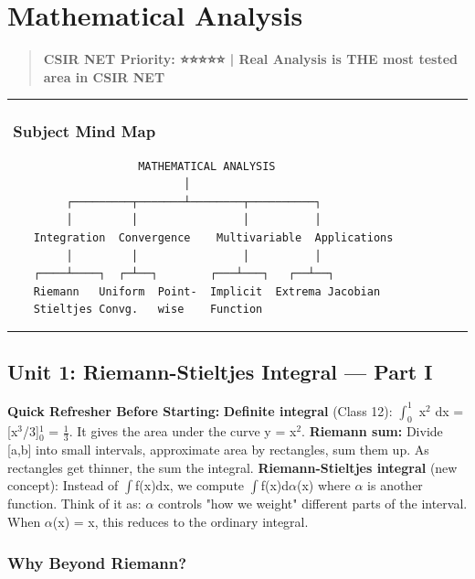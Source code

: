 \documentclass[12pt,a4paper,openany]{book}
\begin{document}
{{\newpage

\chapter{Mathematical Analysis}


\begin{quote}
\textbf{CSIR NET Priority: ⭐⭐⭐⭐⭐ | Real Analysis is THE most tested area in CSIR NET}
\end{quote}

\bigskip\noindent\rule{\textwidth}{0.4pt}\bigskip

\subsection{️ Subject Mind Map}

\begin{verbatim}
                    MATHEMATICAL ANALYSIS
                           │
         ┌─────────┬───────┴────────┬──────────┐
         │         │                │          │
    Integration  Convergence    Multivariable  Applications
         │         │                │          │
    ┌────┴────┐  ┌─┴──┐        ┌───┴───┐   ┌──┴──┐
    Riemann   Uniform  Point-  Implicit  Extrema Jacobian
    Stieltjes Convg.   wise    Function
\end{verbatim}

\bigskip\noindent\rule{\textwidth}{0.4pt}\bigskip

\section{Unit 1: Riemann-Stieltjes Integral — Part I}

\begin{prereqbox}
 \textbf{Quick Refresher Before Starting:}
\textbf{Definite integral} (Class 12): $\int_0^1$ x$^2$ dx = [x$^3$/3]$_0^1$ = $\frac{1}{3}$. It gives the area under the curve y = x$^2$.
\textbf{Riemann sum:} Divide [a,b] into small intervals, approximate area by rectangles, sum them up.
As rectangles get thinner, the sum  the integral.
\textbf{Riemann-Stieltjes integral} (new concept): Instead of $\int$f(x)dx, we compute $\int$f(x)d$\alpha$(x) where $\alpha$ is another function.
Think of it as: $\alpha$ controls "how we weight" different parts of the interval.
When $\alpha$(x) = x, this reduces to the ordinary integral.
\end{prereqbox}



\subsection{Why Beyond Riemann?}

}}
\end{document}
